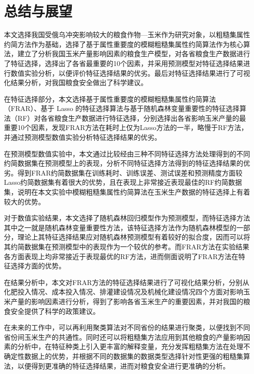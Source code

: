 
\chapter{总结与展望}
本文选择我国受俄乌冲突影响较大的粮食作物—玉米作为研究对象，以粗糙集属性约简方法作为基础，选择了基于属性重要度的模糊粗糙集属性约简算法作为核心算法，建立了分析我国玉米产量影响因素的粮食生产模型，对各省粮食生产数据进行了特征选择，选择出了各省最重要的10个因素，并采用预测模型对特征选择结果进行数值实验分析，以便评价特征选择结果的优劣。最后对特征选择结果进行了可视化结果分析，对我国粮食安全做出了科学建议。

在特征选择部分，本文选择基于属性重要度的模糊粗糙集属性约简算法（FRAR）、基于 Lasso 的特征选择算法与基于随机森林变量重要性的特征选择算法（RF）对各省粮食生产数据进行特征选择，分别选择出各省影响玉米产量的最重要10个因素，发现FRAR方法在耗时上仅为Lasso方法的一半，略慢于RF方法，并通过预测模型数值实验分析特征选择结果的优劣。

在预测模型数值实验中，本文通过比较经由三种不同特征选择方法处理得到的不同约简数据集在预测模型上的表现，分析不同特征选择方法得到的特征选择结果的优劣。得到FRAR约简数据集在训练耗时、训练误差、测试误差和预测精度方面较Lasso约简数据集有着很大的优势，且在表现上非常接近表现最佳的RF约简数据集，说明在本文实验中模糊粗糙集属性约简算法在玉米生产数据的特征选择上有着较大的优势。

对于数值实验结果，本文选择了随机森林回归模型作为预测模型，而特征选择方法其中之一就是随机森林变量重要性方法，该特征选择方法作为随机森林模型的一部分，理论上其特征选择结果应对随机森林预测模型有着较好的拟合度，因而可以将其约简数据集在预测模型中的表现作为一个较优的参考。而FRAR方法在实验结果各方面表现上均非常接近于表现最优的RF方法，进而侧面说明了FRAR方法在特征选择方面的优势。

在结果分析中，本文对FRAR方法的特征选择结果进行了可视化结果分析，分别从化肥投入情况、成本投入情况、排灌建设情况及机械化建设情况四个方面对影响玉米产量的影响因素进行分析，得到了影响各省玉米生产的重要因素，并对我国的粮食安全提供了科学的政策建议。

在未来的工作中，可以再利用聚类算法对不同省份的结果进行聚类，以便找到不同省份间玉米生产的共通性。同时还可以将粗糙集方法应用到其他粮食的产量影响因素的分析中，在特征种类上引入更丰富的解释变量，充分发挥粗糙集方法在处理不确定性数据上的优势，并根据不同的数据集的数据类型选择针对性更强的粗糙集算法，以便得到更准确的特征选择结果，进而对粮食安全进行更准确的分析。
